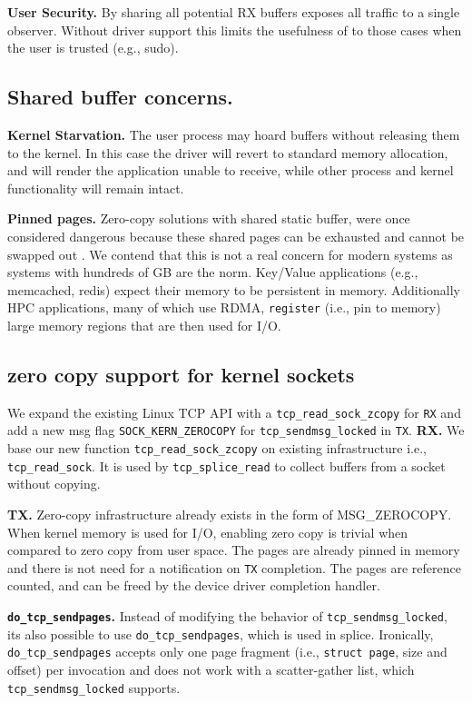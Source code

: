 \noindent\textbf{User Security.} By sharing all potential RX buffers \oursys exposes all traffic to a single observer.
Without driver support this limits the usefulness of \oursys to those cases when the user is trusted (e.g., sudo). 

\subsection{Shared buffer concerns.}
\noindent\textbf{Kernel Starvation.} The user process may hoard \oursys buffers without releasing them to the kernel.
In this case the driver will revert to standard memory allocation, and will render the application unable to receive, while other process and kernel functionality will remain intact.


\noindent\textbf{Pinned pages.} Zero-copy solutions with shared static buffer, were once considered dangerous because these shared pages can be exhausted and cannot be swapped out \cite{song2012performance,yamagiwa2005active}. We contend that this is not a real concern for modern systems as systems with hundreds of GB are the norm. Key/Value applications (e.g., memcached, redis) expect their memory to be persistent in memory. Additionally HPC applications, many\cite{top500} of which use RDMA, \texttt{register} (i.e., pin to memory) large memory regions that are then used for I/O.

\subsection{zero copy support for kernel sockets}
We expand the existing Linux TCP API with a \texttt{tcp\_read\_sock\_zcopy} for \texttt{RX} and add a new msg flag \texttt{SOCK\_KERN\_ZEROCOPY} for \texttt{tcp\_sendmsg\_locked} in \texttt{TX}. 
\noindent \textbf{RX.} We base our new function \texttt{tcp\_read\_sock\_zcopy} on existing infrastructure i.e., \texttt{tcp\_read\_sock}. It is used by \texttt{tcp\_splice\_read} to collect buffers from a socket without copying.

\noindent \textbf{TX.} Zero-copy infrastructure already exists in the form of MSG\_ZEROCOPY\cite{desendmsg}. When kernel memory is used for I/O, enabling zero copy is trivial when compared to zero copy from user space. The pages are already pinned in memory and there is not need for a notification on \texttt{TX} completion. The pages are reference counted, and can be freed by the device driver completion handler.


\noindent \textbf{\texttt{do\_tcp\_sendpages}.}
Instead of modifying the behavior of \texttt{tcp\_sendmsg\_locked}, its also possible to use \texttt{do\_tcp\_sendpages}, which is used in splice. Ironically, \texttt{do\_tcp\_sendpages} accepts only one page fragment (i.e., \texttt{struct page}, size and offset) per invocation and does not work with a scatter-gather list, which \texttt{tcp\_sendmsg\_locked} supports.

